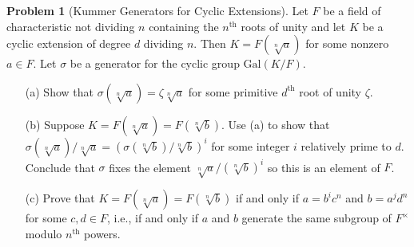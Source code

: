 \documentclass{article}
\theoremstyle{definition}
\newtheorem{prob}{Problem}
\newcommand{\Gal}{\text{Gal}}
\begin{document}
\setcounter{prob}{6}
\begin{prob}[Kummer Generators for Cyclic Extensions]
	Let $F$ be a field of characteristic not dividing $n$ containing the $n^{\text{th}}$ roots of unity and let $K$ be a cyclic extension of degree $d$ dividing $n$.
	Then $K = F(\sqrt[n]{a})$ for some nonzero $a \in F$.
	Let $\sigma$ be a generator for the cyclic group $\Gal(K/F)$.

	\begin{enumerate}
		\item[(a)] Show that $\sigma(\sqrt[n]{a}) = \zeta \sqrt[n]{a}$ for some primitive $d^{\text{th}}$ root of unity $\zeta$.

		\item[(b)] Suppose $K = F(\sqrt[n]{a}) = F(\sqrt[n]{b})$.
			Use (a) to show that $\sigma(\sqrt[n]{a})/\sqrt[n]{a} = (\sigma(\sqrt[n]{b})/\sqrt[n]{b})^i$ for some integer $i$ relatively prime to $d$.
			Conclude that $\sigma$ fixes the element $\sqrt[n]{a}/(\sqrt[n]{b})^i$ so this is an element of $F$.

		\item[(c)] Prove that $K = F(\sqrt[n]{a}) = F(\sqrt[n]{b})$ if and only if $a = b^i c^n$ and $b = a^j d^n$ for some $c, d \in F$, i.e., if and only if $a$ and $b$ generate the same subgroup of $F^\times$ modulo $n^{\text{th}}$ powers.
	\end{enumerate}
\end{prob}
\end{document}
